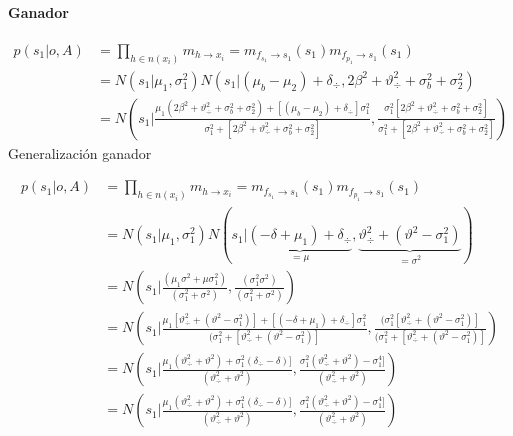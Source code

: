 \documentclass[11pt,twoside, spanish]{report} %
\begin{document}
\paragraph{Ganador}
\begin{equation}
	\begin{split}
		p(s_1|o,A) &= \prod_{h \in n(x_i)} m_{h \rightarrow x_i} = m_{f_{s_1} \rightarrow s_1}(s_1) m_{f_{p_1} \rightarrow s_1}(s_1) \\
		&=  N(s_1| \mu_1, \sigma_1^2)  N( s_1|(\mu_b - \mu_2) + \delta_{\div} , 2\beta^2+\vartheta_{\div}^2 + \sigma_b^2 + \sigma_2^2) \\
		&=  N\left(s_1|\frac{\mu_1(2\beta^2+\vartheta_{\div}^2 + \sigma_b^2 + \sigma_2^2)+ [(\mu_b - \mu_2) + \delta_{\div}]\sigma_1^2}{\sigma_1^2+[2\beta^2+\vartheta_{\div}^2 + \sigma_b^2 + \sigma_2^2]}, \frac{\sigma_1^2[2\beta^2+\vartheta_{\div}^2 + \sigma_b^2 + \sigma_2^2]}{\sigma_1^2+[2\beta^2+\vartheta_{\div}^2 + \sigma_b^2 + \sigma_2^2]}\right)
	\end{split}
\end{equation}
Generalizaci\'on ganador

\begin{equation}
	\begin{split}
		p(s_1|o,A) &= \prod_{h \in n(x_i)} m_{h \rightarrow x_i} = m_{f_{s_1} \rightarrow s_1}(s_1) m_{f_{p_1} \rightarrow s_1}(s_1) \\
		&=  N(s_1| \mu_1, \sigma_1^2)   N( s_1| \underbrace{(-\delta + \mu_1) + \delta_{\div}}_{=\mu} ,\underbrace{\vartheta_{\div}^2 + (\vartheta^2 - \sigma_1^2 )}_{=\sigma^2})  \\
		&=  N\left(s_1|\frac{(\mu_1\sigma^2+\mu\sigma_1^2)}{(\sigma_1^2+\sigma^2)}, \frac{(\sigma_1^2\sigma^2)}{(\sigma_1^2+\sigma^2)}\right)\\
		&= N\left(s_1\Big| \frac{\mu_1 [\vartheta_{\div}^2 + (\vartheta^2 - \sigma_1^2 )]+[(-\delta + \mu_1) + \delta_{\div}]\sigma_1^2}{(\sigma_1^2+[\vartheta_{\div}^2 + (\vartheta^2 - \sigma_1^2 )]},
		\frac{(\sigma_1^2[\vartheta_{\div}^2 + (\vartheta^2 - \sigma_1^2 )]}{(\sigma_1^2+[\vartheta_{\div}^2 + (\vartheta^2 - \sigma_1^2 )]}\right)\\
		&= N\left(s_1\Big| \frac{\mu_1 (\vartheta_{\div}^2 + \vartheta^2)+\sigma_1^2(\delta_{\div}-\delta)]}{(\vartheta_{\div}^2 + \vartheta^2 )},
		\frac{\sigma_1^2(\vartheta_{\div}^2 + \vartheta^2) - \sigma_1^4 ]}{(\vartheta_{\div}^2 + \vartheta^2)}\right)\\
		&= N\left(s_1\Big| \frac{\mu_1 (\vartheta_{\div}^2 + \vartheta^2)+\sigma_1^2(\delta_{\div}-\delta)]}{(\vartheta_{\div}^2 + \vartheta^2 )},
		\frac{\sigma_1^2(\vartheta_{\div}^2 + \vartheta^2) - \sigma_1^4 ]}{(\vartheta_{\div}^2 + \vartheta^2)}\right)
	\end{split}
\end{equation}
\end{document}

